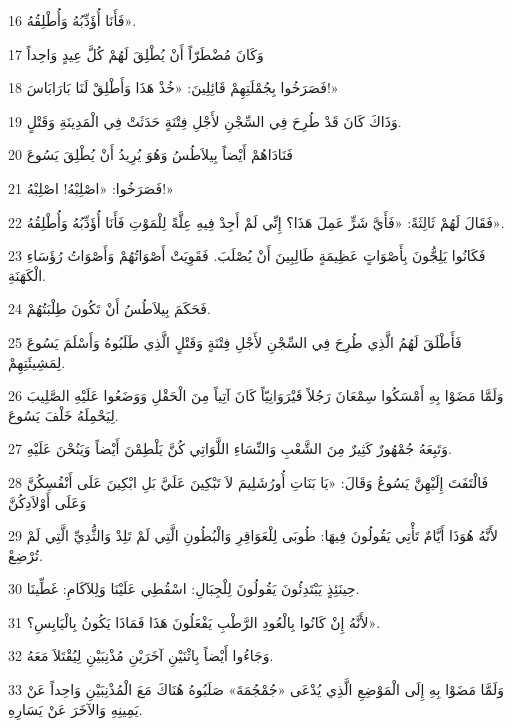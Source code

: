 \par 16 فَأَنَا أُؤَدِّبُهُ وَأُطْلِقُهُ».
\par 17 وَكَانَ مُضْطَرّاً أَنْ يُطْلِقَ لَهُمْ كُلَّ عِيدٍ وَاحِداً
\par 18 فَصَرَخُوا بِجُمْلَتِهِمْ قَائِلِينَ: «خُذْ هَذَا وَأَطْلِقْ لَنَا بَارَابَاسَ!»
\par 19 وَذَاكَ كَانَ قَدْ طُرِحَ فِي السِّجْنِ لأَجْلِ فِتْنَةٍ حَدَثَتْ فِي الْمَدِينَةِ وَقَتْلٍ.
\par 20 فَنَادَاهُمْ أَيْضاً بِيلاَطُسُ وَهُوَ يُرِيدُ أَنْ يُطْلِقَ يَسُوعَ
\par 21 فَصَرَخُوا: «اصْلِبْهُ! اصْلِبْهُ!»
\par 22 فَقَالَ لَهُمْ ثَالِثَةً: «فَأَيَّ شَرٍّ عَمِلَ هَذَا؟ إِنِّي لَمْ أَجِدْ فِيهِ عِلَّةً لِلْمَوْتِ فَأَنَا أُؤَدِّبُهُ وَأُطْلِقُهُ».
\par 23 فَكَانُوا يَلِجُّونَ بِأَصْوَاتٍ عَظِيمَةٍ طَالِبِينَ أَنْ يُصْلَبَ. فَقَوِيَتْ أَصْوَاتُهُمْ وَأَصْوَاتُ رُؤَسَاءِ الْكَهَنَةِ.
\par 24 فَحَكَمَ بِيلاَطُسُ أَنْ تَكُونَ طِلْبَتُهُمْ.
\par 25 فَأَطْلَقَ لَهُمُ الَّذِي طُرِحَ فِي السِّجْنِ لأَجْلِ فِتْنَةٍ وَقَتْلٍ الَّذِي طَلَبُوهُ وَأَسْلَمَ يَسُوعَ لِمَشِيئَتِهِمْ.
\par 26 وَلَمَّا مَضَوْا بِهِ أَمْسَكُوا سِمْعَانَ رَجُلاً قَيْرَوَانِيّاً كَانَ آتِياً مِنَ الْحَقْلِ وَوَضَعُوا عَلَيْهِ الصَّلِيبَ لِيَحْمِلَهُ خَلْفَ يَسُوعَ.
\par 27 وَتَبِعَهُ جُمْهُورٌ كَثِيرٌ مِنَ الشَّعْبِ وَالنِّسَاءِ اللَّوَاتِي كُنَّ يَلْطِمْنَ أَيْضاً وَيَنُحْنَ عَلَيْهِ.
\par 28 فَالْتَفَتَ إِلَيْهِنَّ يَسُوعُ وَقَالَ: «يَا بَنَاتِ أُورُشَلِيمَ لاَ تَبْكِينَ عَلَيَّ بَلِ ابْكِينَ عَلَى أَنْفُسِكُنَّ وَعَلَى أَوْلاَدِكُنَّ
\par 29 لأَنَّهُ هُوَذَا أَيَّامٌ تَأْتِي يَقُولُونَ فِيهَا: طُوبَى لِلْعَوَاقِرِ وَالْبُطُونِ الَّتِي لَمْ تَلِدْ وَالثُّدِيِّ الَّتِي لَمْ تُرْضِعْ.
\par 30 حِينَئِذٍ يَبْتَدِئُونَ يَقُولُونَ لِلْجِبَالِ: اسْقُطِي عَلَيْنَا وَلِلآكَامِ: غَطِّينَا.
\par 31 لأَنَّهُ إِنْ كَانُوا بِالْعُودِ الرَّطْبِ يَفْعَلُونَ هَذَا فَمَاذَا يَكُونُ بِالْيَابِسِ؟».
\par 32 وَجَاءُوا أَيْضاً بِاثْنَيْنِ آخَرَيْنِ مُذْنِبَيْنِ لِيُقْتَلاَ مَعَهُ.
\par 33 وَلَمَّا مَضَوْا بِهِ إِلَى الْمَوْضِعِ الَّذِي يُدْعَى «جُمْجُمَةَ» صَلَبُوهُ هُنَاكَ مَعَ الْمُذْنِبَيْنِ وَاحِداً عَنْ يَمِينِهِ وَالآخَرَ عَنْ يَسَارِهِ.
